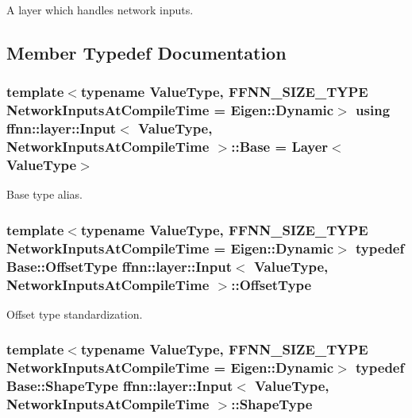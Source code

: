 A layer which handles network inputs. 

\subsection{Member Typedef Documentation}
\hypertarget{classffnn_1_1layer_1_1_input_a7d3eef885863ffbab29a2dba5b9d6e2a}{
\subsubsection[{Base}]{\setlength{\rightskip}{0pt plus 5cm}template$<$typename Value\-Type, F\-F\-N\-N\-\_\-\-S\-I\-Z\-E\-\_\-\-T\-Y\-P\-E Network\-Inputs\-At\-Compile\-Time = Eigen\-::\-Dynamic$>$ using {\bf ffnn\-::layer\-::\-Input}$<$ Value\-Type, Network\-Inputs\-At\-Compile\-Time $>$\-::{\bf Base} =  {\bf Layer}$<$Value\-Type$>$}}\label{classffnn_1_1layer_1_1_input_a7d3eef885863ffbab29a2dba5b9d6e2a}


Base type alias. 

\hypertarget{classffnn_1_1layer_1_1_input_af8249b647f4c1d4404ae98741b1686e1}{
\subsubsection[{Offset\-Type}]{\setlength{\rightskip}{0pt plus 5cm}template$<$typename Value\-Type, F\-F\-N\-N\-\_\-\-S\-I\-Z\-E\-\_\-\-T\-Y\-P\-E Network\-Inputs\-At\-Compile\-Time = Eigen\-::\-Dynamic$>$ typedef Base\-::\-Offset\-Type {\bf ffnn\-::layer\-::\-Input}$<$ Value\-Type, Network\-Inputs\-At\-Compile\-Time $>$\-::{\bf Offset\-Type}}}\label{classffnn_1_1layer_1_1_input_af8249b647f4c1d4404ae98741b1686e1}


Offset type standardization. 

\hypertarget{classffnn_1_1layer_1_1_input_a98068063d95f6c495f2b6ffe5d2890a7}{
\subsubsection[{Shape\-Type}]{\setlength{\rightskip}{0pt plus 5cm}template$<$typename Value\-Type, F\-F\-N\-N\-\_\-\-S\-I\-Z\-E\-\_\-\-T\-Y\-P\-E Network\-Inputs\-At\-Compile\-Time = Eigen\-::\-Dynamic$>$ typedef {\bf Base\-::\-Shape\-Type} {\bf ffnn\-::layer\-::\-Input}$<$ Value\-Type, Network\-Inputs\-At\-Compile\-Time $>$\-::{\bf Shape\-Type}}}\label{classffnn_1_1layer_1_1_input_a98068063d95f6c495f2b6ffe5d2890a7}


